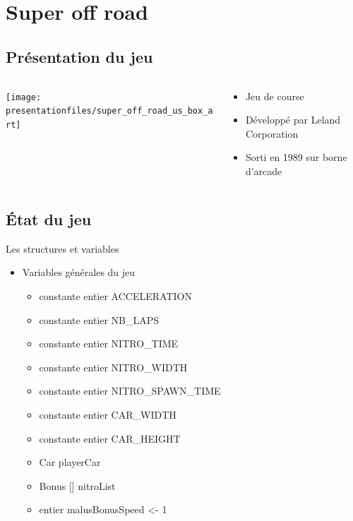 \documentclass[10pt,dvipsnames,final]{beamer}
\newcommand{\midcolumn}[2]{
\begin{columns}
	\begin{column}{0.5\textwidth}
		#1
	\end{column}
	\begin{column}{0.5\textwidth}
		#2
	\end{column}
\end{columns}
}
\begin{document}
\section{Super off road}

\subsection{Présentation du jeu}

\begin{frame}
\midcolumn{\texttt{[image: presentationfiles/super\_off\_road\_us\_box\_art]}}{
\begin{itemize}
	\item Jeu de course
	\item Développé par Leland Corporation
	\item Sorti en 1989 sur borne d'arcade
\end{itemize}
}
\end{frame}

\subsection{État du jeu}

\begin{frame}{Les structures et variables}
\begin{itemize}
\item Variables générales du jeu
\begin{itemize}
\item constante entier ACCELERATION
\item constante entier NB\_LAPS
\item constante entier NITRO\_TIME
\item constante entier NITRO\_WIDTH
\item constante entier NITRO\_SPAWN\_TIME
\item constante entier CAR\_WIDTH
\item constante entier CAR\_HEIGHT
\item Car playerCar
\item Bonus [] nitroList
\item entier malusBonusSpeed <- 1
\end{itemize}
\end{itemize}
\end{frame}
\end{document}
